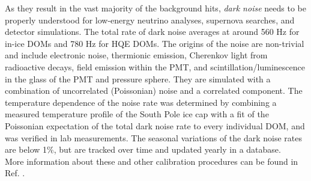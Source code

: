 As they result in the vast majority of the background hits, \textit{dark noise} needs to be properly understood for low-energy neutrino analyses, supernova searches, and detector simulations. The total rate of dark noise averages at around 560 Hz for in-ice DOMs and 780 Hz for HQE DOMs. The origins of the noise are non-trivial and include electronic noise, thermionic emission, Cherenkov light from radioactive decays, field emission within the PMT, and scintillation/luminescence in the glass of the PMT and pressure sphere. They are simulated with a combination of uncorrelated (Poissonian) noise and a correlated component. The temperature dependence of the noise rate was determined by combining a measured temperature profile of the South Pole ice cap with a fit of the Poissonian expectation of the total dark noise rate to every individual DOM, and was verified in lab measurements. The seasonal variations of the dark noise rates are below 1\%, but are tracked over time and updated yearly in a database.\\

\noindent More information about these and other calibration procedures can be found in Ref. \cite{Aartsen:2016nxy}.

